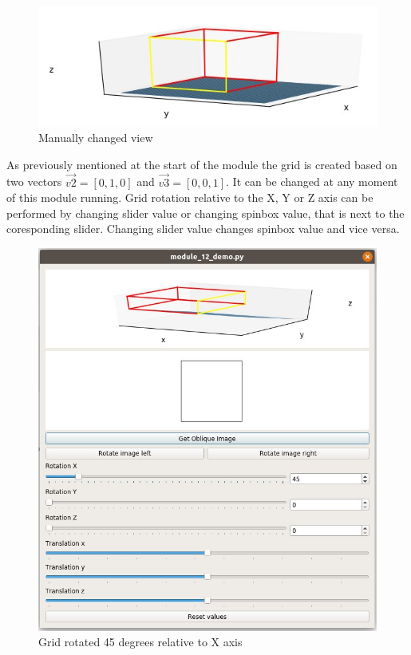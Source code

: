 \begin{figure}[H]
\centering{}\includegraphics[scale=0.7]{figures/module_12/mod12changedview}\caption{Manually changed view\label{fig:figure/module_12/Preprocessing}}
\end{figure}

\indent As previously mentioned at the start of the module the grid is created based on two vectors $\vec{v2}=[0,1,0]$ and $\vec{v3}=[0,0,1]$. It can be changed at any moment of this module running.
\newline\indent Grid rotation relative to the X, Y or Z axis can be performed by changing slider value or changing spinbox value, that is next to the coresponding slider. Changing slider value changes spinbox value and vice versa.

\begin{figure}[H]
\centering{}\includegraphics[scale=0.7]{figures/module_12/mod1245degrees}\caption{Grid rotated 45 degrees relative to X axis\label{fig:figure/module_12/Preprocessing}}
\end{figure}

